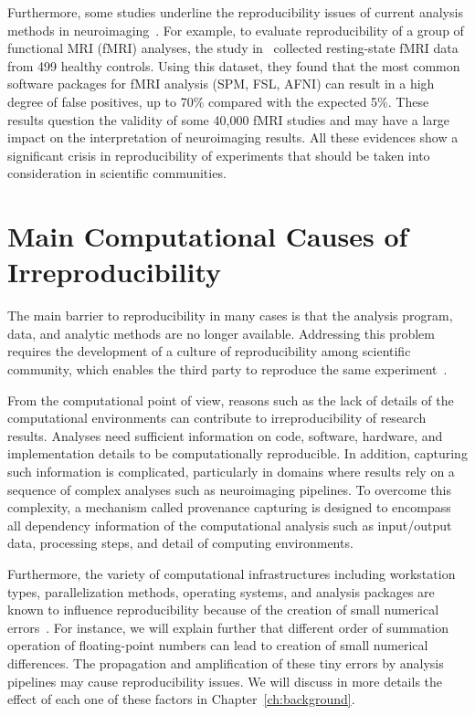 Furthermore, some studies underline the reproducibility issues of 
current analysis methods in neuroimaging~\cite{jovicich2009mri, 
muller2017altered, eklund2016cluster}. For example, to evaluate 
reproducibility of a group of functional MRI (fMRI) analyses, the study 
in~\cite{eklund2016cluster} collected resting-state fMRI data from 499 
healthy controls. Using this dataset, they found that the most common 
software packages for fMRI analysis (SPM, FSL, AFNI) can result in a 
high degree of false positives, up to 70\% compared with the expected 
5\%. These results question the validity of some 40,000 fMRI studies 
and may have a large impact on the interpretation of neuroimaging 
results. All these evidences show a significant crisis in 
reproducibility of experiments that should be taken into consideration in 
scientific communities.

\section{Main Computational Causes of Irreproducibility} 

The main barrier to reproducibility in many cases is 
that the analysis program, data, and analytic methods are no longer 
available. Addressing this problem requires the development of a culture of 
reproducibility among scientific community, which enables the third 
party to reproduce the same experiment~\cite{peng2011reproducible, 
stodden2016enhancing}. 

From the computational point of view, reasons such as the lack of 
details of the computational environments can contribute to 
irreproducibility of research results. Analyses need sufficient 
information on code, software, hardware, and implementation details to 
be computationally reproducible. In addition, capturing such 
information is complicated, particularly in domains where results rely 
on a sequence of complex analyses such as neuroimaging pipelines. 
To overcome this complexity, a mechanism called provenance capturing is
designed to encompass all dependency information of the computational 
analysis such as input/output data, processing steps, and 
detail of computing environments. 

Furthermore, the variety of computational infrastructures including 
workstation types, parallelization methods, operating systems, and 
analysis packages are known to influence reproducibility because of the 
creation of small numerical errors~\cite{Gronenschild2012, 
diethelm2012limits, Glatard2015}. 
For instance, we will explain further that different order of 
summation operation of floating-point numbers can lead to creation of 
small numerical differences. 
The propagation and amplification of these tiny 
errors by analysis pipelines may cause reproducibility issues. We 
will discuss in more details the effect of each one of these factors in Chapter~\ref{ch:background}.

